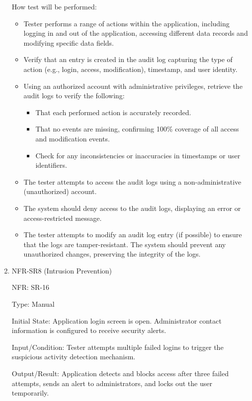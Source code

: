 \documentclass[12pt, titlepage]{article}
\begin{document}
\begin{enumerate}
  How test will be performed: 
  \begin{itemize}
    \item Tester performs a range of actions within the application, including logging
    in and out of the application, accessing different data records and modifying
    specific data fields.
    \item Verify that an entry is created in the audit log capturing the type of action
    (e.g., login, access, modification), timestamp, and user identity.
    \item Using an authorized account with administrative privileges, retrieve the audit
    logs to verify the following:
    \begin{itemize}
      \item That each performed action is accurately recorded.
      \item That no events are missing, confirming 100\% coverage of all access and
      modification events.
      \item Check for any inconsistencies or inaccuracies in timestamps or user identifiers.
    \end{itemize}
    \item The tester attempts to access the audit logs using a non-administrative (unauthorized)
    account.
    \item The system should deny access to the audit logs, displaying an error or access-restricted
    message.
    \item The tester attempts to modify an audit log entry (if possible) to ensure that the logs are
    tamper-resistant. The system should prevent any unauthorized changes, preserving the integrity of
    the logs.
  \end{itemize}

\item{NFR-SR8 (Intrusion Prevention)\\}
  
  NFR: SR-16
  
  Type: Manual
  
  Initial State: Application login screen is open. Administrator contact information is configured
  to receive security alerts.
  
  Input/Condition: Tester attempts multiple failed logins to trigger the suspicious activity
  detection mechanism.
  
  Output/Result:  Application detects and blocks access after three failed attempts, sends an
  alert to administrators, and locks out the user temporarily.


\end{enumerate}
\end{document}

